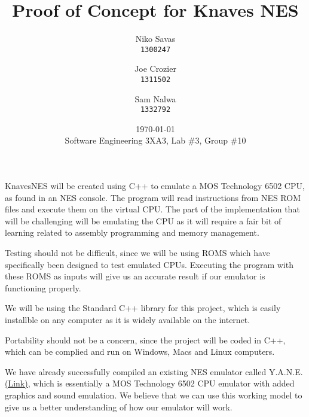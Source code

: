 \documentclass[12pt]{article}
\begin{document}
\title{Proof of Concept for Knaves NES}
\date{\today\\
	{\medskip\small Software Engineering 3XA3, Lab \#3, Group \#10}
}
\author{Niko Savas\\
	\texttt{1300247}
	\and
	Joe Crozier\\
	\texttt{1311502}
	\and
	Sam Nalwa\\
	\texttt{1332792}
}
	
\maketitle

KnavesNES will be created using C++ to emulate a MOS Technology 6502 CPU, as found in an NES console. The program will read instructions from NES ROM files and execute them on the virtual CPU. The part of the implementation that will be challenging will be emulating the CPU as it will require a fair bit of learning related to assembly programming and memory management. 

 Testing should not be difficult, since we will be using ROMS which have specifically been designed to test emulated CPUs. Executing the program with these ROMS as inputs will give us an accurate result if our emulator is functioning properly.

We will be using the Standard C++ library for this project, which is easily installble on any computer as it is widely available on the internet. 

 Portability should not be a concern, since the project will be coded in C++, which can be complied and run on Windows, Macs and Linux computers. 

We have already successfully compiled an existing NES emulator called Y.A.N.E. \href{http://alike.se/yane/}{(Link)}, which is essentially a MOS Technology 6502 CPU emulator with added graphics and sound emulation. We believe that we can use this working model to give us a better understanding of how our emulator will work.
\end{document}
